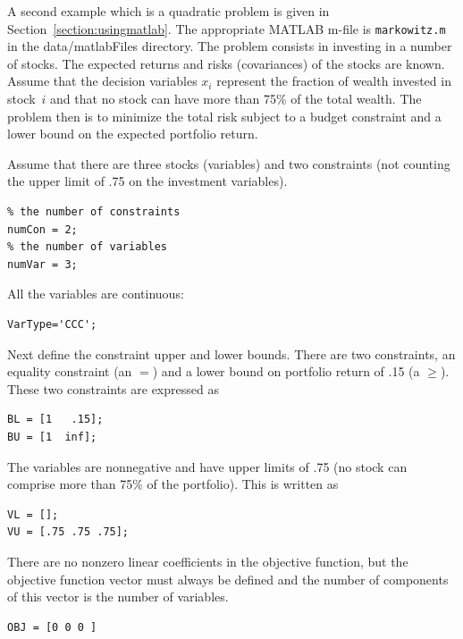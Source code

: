 \documentclass[11pt]{article}
\renewcommand{\_}{{\char"5F}}
\renewcommand{\{}{{\char"7B}}
\renewcommand{\}}{{\char"7D}}
\renewcommand{\^}{{\char"0D}}
\renewcommand{\'}{{\char"0D}}
\begin{document}
\begin{enumerate}[Step 1:]
 A second example which is a quadratic problem is given in Section~\ref{section:usingmatlab}.
The appropriate MATLAB m-file is {\tt markowitz.m} in the {data/matlabFiles} directory.
The problem consists in investing  in a number of stocks. The expected returns and risks
(covariances) of the stocks are known. Assume that the decision variables $x_i$
represent the fraction of wealth invested in stock~$i$ and that no stock can have
more than 75\% of the total wealth. The problem then is to minimize the total risk
subject to a budget constraint and a lower bound on the expected portfolio return.

Assume that there are three stocks (variables) and two constraints (not counting the upper limit  %
of .75 on the investment variables).


\begin{verbatim}
% the number of constraints
numCon = 2;
% the number of variables
numVar = 3;
\end{verbatim}



All the variables are continuous:


\begin{verbatim}
VarType='CCC';
\end{verbatim}


Next define the constraint upper and lower bounds. There are two constraints, an equality  constraint (an $=$) and a lower bound on portfolio return of .15 (a $\ge$). These two constraints are expressed as



\begin{verbatim}
BL = [1   .15];
BU = [1  inf];
\end{verbatim}



The variables are nonnegative and have upper limits of .75 (no stock can comprise more than 75\% of the portfolio).  This is written as




\begin{verbatim}
VL = [];
VU = [.75 .75 .75];
\end{verbatim}



There are no nonzero linear coefficients in the objective function, but the objective function vector must always be defined and the number of components of this vector is the number of variables.



\begin{verbatim}
OBJ = [0 0 0 ]
\end{verbatim}



\end{enumerate}
\end{document}
